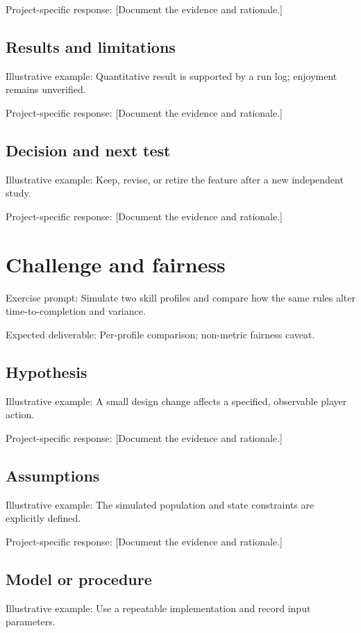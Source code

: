 \documentclass[11pt]{article}
\begin{document}
Project-specific response: [Document the evidence and rationale.]


\subsection{Results and limitations}
Illustrative example: Quantitative result is supported by a run log; enjoyment remains unverified.

Project-specific response: [Document the evidence and rationale.]


\subsection{Decision and next test}
Illustrative example: Keep, revise, or retire the feature after a new independent study.

Project-specific response: [Document the evidence and rationale.]


\section{Challenge and fairness}
Exercise prompt: Simulate two skill profiles and compare how the same rules alter time-to-completion and variance.

Expected deliverable: Per-profile comparison; non-metric fairness caveat.


\subsection{Hypothesis}
Illustrative example: A small design change affects a specified, observable player action.

Project-specific response: [Document the evidence and rationale.]


\subsection{Assumptions}
Illustrative example: The simulated population and state constraints are explicitly defined.

Project-specific response: [Document the evidence and rationale.]


\subsection{Model or procedure}
Illustrative example: Use a repeatable implementation and record input parameters.
\end{document}
